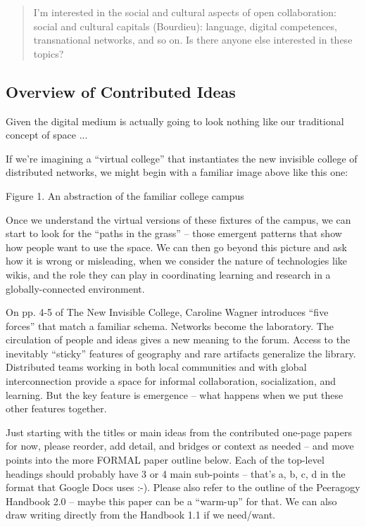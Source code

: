 \begin{cframed}[scarlet]
\begin{quote}
I'm interested in the social and cultural aspects of open collaboration: social and cultural capitals (Bourdieu): language, digital competences, transnational networks, and so on. Is there anyone else interested in these topics?
\end{quote}

\subsection{Overview of Contributed Ideas}

Given the digital medium is actually going to look nothing like our traditional concept of space ...

If we're imagining a ``virtual college'' that instantiates the new invisible college of distributed networks, we might begin with a familiar image above like this one:

Figure 1. An abstraction of the familiar college campus

Once we understand the virtual versions of these fixtures of the campus, we can start to look for the ``paths in the grass'' -- those emergent patterns that show how people want to use the space. We can then go beyond this picture and ask how it is wrong or misleading, when we consider the nature of technologies like wikis, and the role they can play in coordinating learning and research in a globally-connected environment.

On pp. 4-5 of The New Invisible College, Caroline Wagner introduces ``five forces'' that match a familiar schema. Networks become the laboratory. The circulation of people and ideas gives a new meaning to the forum. Access to the inevitably ``sticky'' features of geography and rare artifacts generalize the library. Distributed teams working in both local communities and with global interconnection provide a space for informal collaboration, socialization, and learning. But the key feature is emergence -- what happens when we put these other features together.

Just starting with the titles or main ideas from the contributed one-page papers for now, please reorder, add detail, and bridges or context as needed -- and move points into the more FORMAL paper outline below. Each of the top-level headings should probably have 3 or 4 main sub-points -- that's a, b, c, d in the format that Google Docs uses :-). Please also refer to the outline of the Peeragogy Handbook 2.0 -- maybe this paper can be a ``warm-up'' for that. We can also draw writing directly from the Handbook 1.1 if we need/want.


\end{cframed}
